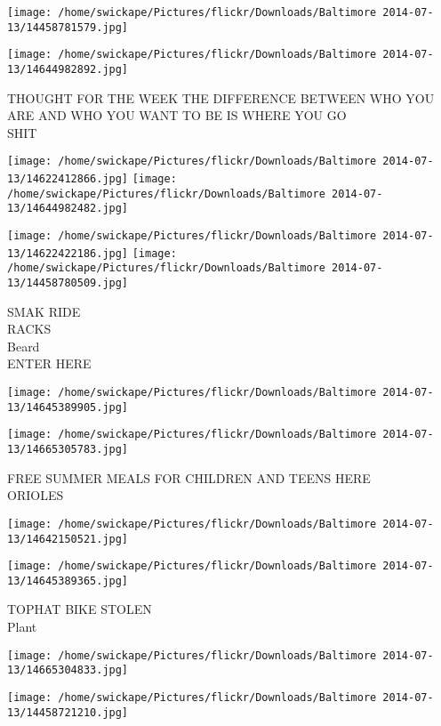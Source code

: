 \documentclass[10pt,letterpaper]{article}
\begin{document}
\texttt{[image: /home/swickape/Pictures/flickr/Downloads/Baltimore 2014-07-13/14458781579.jpg]}

\vspace{0.25in}
\texttt{[image: /home/swickape/Pictures/flickr/Downloads/Baltimore 2014-07-13/14644982892.jpg]}

THOUGHT FOR THE WEEK THE DIFFERENCE BETWEEN WHO YOU ARE AND WHO YOU WANT TO BE IS WHERE YOU GO\\
SHIT
\pagebreak

\texttt{[image: /home/swickape/Pictures/flickr/Downloads/Baltimore 2014-07-13/14622412866.jpg]}
\texttt{[image: /home/swickape/Pictures/flickr/Downloads/Baltimore 2014-07-13/14644982482.jpg]}

\texttt{[image: /home/swickape/Pictures/flickr/Downloads/Baltimore 2014-07-13/14622422186.jpg]}
\texttt{[image: /home/swickape/Pictures/flickr/Downloads/Baltimore 2014-07-13/14458780509.jpg]}

SMAK RIDE\\
RACKS\\
Beard\\
ENTER HERE
\pagebreak

\texttt{[image: /home/swickape/Pictures/flickr/Downloads/Baltimore 2014-07-13/14645389905.jpg]}

\vspace{0.25in}
\texttt{[image: /home/swickape/Pictures/flickr/Downloads/Baltimore 2014-07-13/14665305783.jpg]}

FREE SUMMER MEALS FOR CHILDREN AND TEENS HERE\\
ORIOLES
\pagebreak

\texttt{[image: /home/swickape/Pictures/flickr/Downloads/Baltimore 2014-07-13/14642150521.jpg]}

\vspace{0.25in}
\texttt{[image: /home/swickape/Pictures/flickr/Downloads/Baltimore 2014-07-13/14645389365.jpg]}

TOPHAT BIKE STOLEN\\
Plant
\pagebreak

\texttt{[image: /home/swickape/Pictures/flickr/Downloads/Baltimore 2014-07-13/14665304833.jpg]}

\vspace{0.25in}
\texttt{[image: /home/swickape/Pictures/flickr/Downloads/Baltimore 2014-07-13/14458721210.jpg]}
\end{document}
